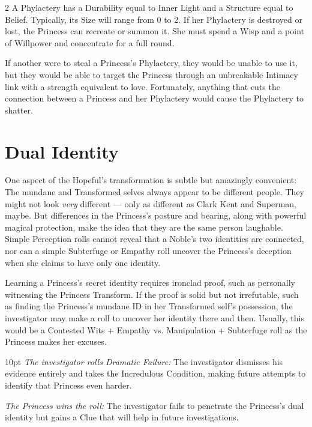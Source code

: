 \begin{multicols}{2}
A Phylactery has a Durability equal to Inner Light and a Structure equal to Belief. Typically, its Size will range from 0 to 2. If her Phylactery is destroyed or lost, the Princess can recreate or summon it. She must spend a Wisp and a point of Willpower and concentrate for a full round. 

If another were to steal a Princess's Phylactery, they would be unable to use it, but they would be able to target the Princess through an unbreakable Intimacy link with a strength equivalent to love. Fortunately, anything that cuts the connection between a Princess and her Phylactery would cause the Phylactery to shatter.

\section*{Dual Identity}
\label{sec:DualIdentity}

One aspect of the Hopeful's transformation is subtle but amazingly convenient: The mundane and Transformed selves always appear to be different people. They might not look \textit{very} different — only as different as Clark Kent and Superman, maybe. But differences in the Princess's posture and bearing, along with powerful magical protection, make the idea that they are the same person laughable. Simple Perception rolls cannot reveal that a Noble's two identities are connected, nor can a simple Subterfuge or Empathy roll uncover the Princess's deception when she claims to have only one identity. 

Learning a Princess's secret identity requires ironclad proof, such as personally witnessing the Princess Transform. If the proof is solid but not irrefutable, such as finding the Princess's mundane ID in her Transformed self's possession, the investigator may make a roll to uncover her identity there and then. Usually, this would be a Contested Wits + Empathy vs. Manipulation + Subterfuge roll as the Princess makes her excuses. 

\begin{myindentpar}{10pt}
    \emph{The investigator rolls Dramatic Failure:} The investigator dismisses his evidence entirely and takes the Incredulous Condition, making future attempts to identify that Princess even harder. 
    
    \emph{The Princess wins the roll:} The investigator fails to penetrate the Princess's dual identity but gains a Clue that will help in future investigations. 
    

\end{myindentpar}
\end{multicols}
